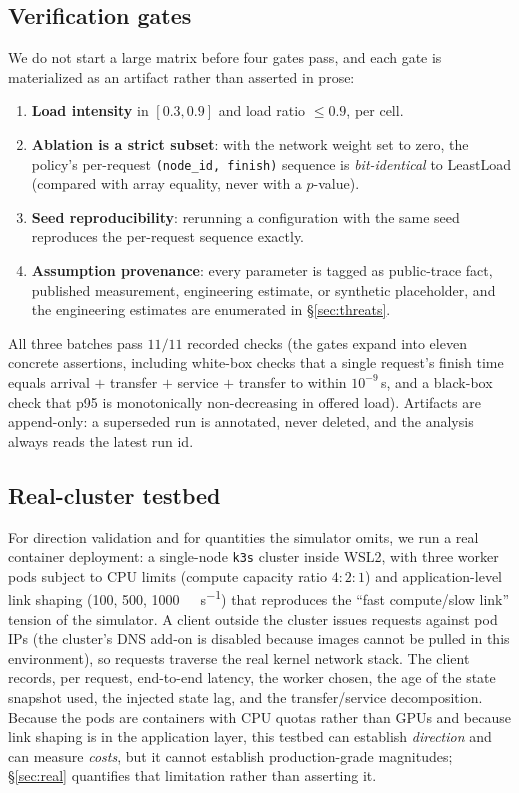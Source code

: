 \subsection{Verification gates}
\label{sec:gates}
We do not start a large matrix before four gates pass, and each gate is materialized as an
artifact rather than asserted in prose:
\begin{enumerate}
  \item \textbf{Load intensity} in $[0.3, 0.9]$ and load ratio $\le 0.9$, per cell.
  \item \textbf{Ablation is a strict subset}: with the network weight set to zero, the policy's
        per-request \texttt{(node\_id, finish)} sequence is \emph{bit-identical} to LeastLoad
        (compared with array equality, never with a $p$-value).
  \item \textbf{Seed reproducibility}: rerunning a configuration with the same seed reproduces
        the per-request sequence exactly.
  \item \textbf{Assumption provenance}: every parameter is tagged as public-trace fact, published
        measurement, engineering estimate, or synthetic placeholder, and the engineering
        estimates are enumerated in \S\ref{sec:threats}.
\end{enumerate}
All three batches pass $11/11$ recorded checks (the gates expand into eleven concrete assertions,
including white-box checks that a single request's finish time equals
arrival $+$ transfer $+$ service $+$ transfer to within $10^{-9}$\,s, and a black-box check that
p95 is monotonically non-decreasing in offered load). Artifacts are append-only: a superseded run
is annotated, never deleted, and the analysis always reads the latest run id.

\subsection{Real-cluster testbed}
\label{sec:setup:real}
For direction validation and for quantities the simulator omits, we run a real container
deployment: a single-node \texttt{k3s} cluster inside WSL2, with three worker pods subject to CPU
limits (compute capacity ratio $4{:}2{:}1$) and application-level link shaping
(\SI{100}{}, \SI{500}{}, \SI{1000}{\mega\bit\per\second}) that reproduces the
``fast compute/slow link'' tension of the simulator. A client outside the cluster issues
requests against pod IPs (the cluster's DNS add-on is disabled because images cannot be pulled in
this environment), so requests traverse the real kernel network stack. The client records, per
request, end-to-end latency, the worker chosen, the age of the state snapshot used, the injected
state lag, and the transfer/service decomposition. Because the pods are containers with CPU
quotas rather than GPUs and because link shaping is in the application layer, this testbed can
establish \emph{direction} and can measure \emph{costs}, but it cannot establish production-grade
magnitudes; \S\ref{sec:real} quantifies that limitation rather than asserting it.

